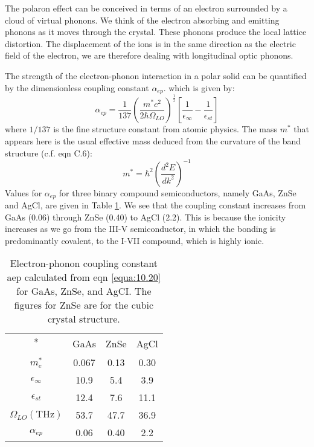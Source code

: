 \documentclass[12pt]{book}
\begin{document}
{The polaron effect can be conceived in terms of an electron surrounded by a cloud of virtual phonons. We think of the electron absorbing and emitting phonons as it moves through the crystal. These phonons produce the local lattice distortion. The displacement of the ions is in the same direction as the electric field of the electron, we are therefore dealing with longitudinal optic phonons.

The strength of the electron-phonon interaction in a polar solid can be quantified by the dimensionless coupling constant $\alpha_{ep}$. which is given by:
\begin{equation}\label{equa:10.20}
  \alpha_{ep}=\frac{1}{137}\left(\frac{m^*c^2}{2\hbar\Omega_{LO}}\right)^{\frac{1}{2}}[\frac{1}{\epsilon_{\infty}}-\frac{1}{\epsilon_{st}}]
\end{equation}
where $1/137$ is the fine structure constant from atomic physics. The mass $m^*$ that appears here is the usual effective mass deduced from the curvature of the band structure (c.f. eqn C.6):
\begin{equation}\label{equa:10.21}
  m^*=\hbar^2\left(\frac{d^2E}{dk^2}\right)^{-1}
\end{equation}
Values for $\alpha_{ep}$ for three binary compound semiconductors, namely GaAs, ZnSe and AgCl, are given in Table \ref{tab:10.3}. We see that the coupling constant increases from GaAs (0.06) through ZnSe (0.40) to AgCl (2.2). This is because the ionicity increases as we go from the III-V semiconductor, in which the bonding is predominantly covalent, to the I-VII compound, which is highly ionic.

\begin{table}
  \centering
  \caption{Electron-phonon coupling constant aep calculated from eqn \ref{equa:10.20} for GaAs, ZnSe, and AgCI. The figures for ZnSe are for the cubic crystal structure.}\label{tab:10.3}
  \begin{tabular}{cccc}
    \hline
    * & GaAs & ZnSe & AgCl \\
    $m_e^*$ & 0.067 & 0.13 & 0.30 \\
    $\epsilon_{\infty}$ & 10.9 & 5.4 & 3.9 \\
    $\epsilon_{st}$ & 12.4 & 7.6 & 11.1 \\
    $\Omega_{LO}(\mathrm{THz})$ & 53.7 & 47.7 & 36.9 \\
    $\alpha_{ep}$ & 0.06 & 0.40 & 2.2 \\
    \hline
  \end{tabular}
\end{table}

}
\end{document}
